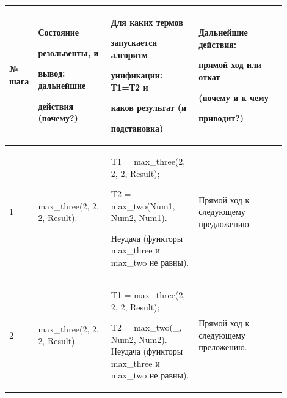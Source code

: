 \documentclass[a4paper,12pt]{article}
\begin{document}
	\begin{center}
		\begin{longtable}[h!]{|p{0.05\linewidth}|p{0.25\linewidth}|p{ 0.3\linewidth}|p{ 0.3\linewidth}|}
			
			\hline
			
			{№ шага} & {Состояние 
				
				
				
				резольвенты, и 
				
				
				
				вывод: дальнейшие 
				
				
				
				действия (почему?)} & {Для каких термов 
				
				
				
				запускается алгоритм 
				
				
				
				унификации: Т1=Т2 и 
				
				
				
				каков {\bf результат} (и 
				
				
				
				подстановка)} & {Дальнейшие действия: 
				
				
				
				прямой ход или откат 
				
				
				
				(почему и к чему 
				
				
				
				приводит?)}\\
			
			\hline
			
			{1} & {max\_three(2, 2, 2, Result).} & {T1 = max\_three(2, 2, 2, Result);
				
				
				
				T2 = max\_two(Num1, Num2, Num1). 
				
				
				
				Неудача (функторы max\_three и max\_two не равны).} & {Прямой ход к следующему предложению.}\\
			
			\hline
			
			{2} & {max\_three(2, 2, 2, Result).} & {T1 = max\_three(2, 2, 2, Result);
				
				
				
				T2 = max\_two(\_, Num2, Num2). Неудача (функторы max\_three и max\_two не равны).} & {Прямой ход к следующему преложению.}\\
			

\end{longtable}
\end{center}
\end{document}
